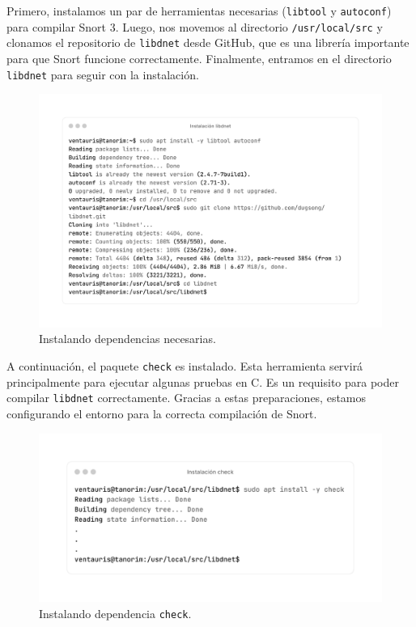 \documentclass[11pt,a4paper,twoside]{report}
\begin{document}
Primero, instalamos un par de herramientas necesarias (\texttt{libtool} y \texttt{autoconf}) para compilar Snort 3. Luego, nos movemos al directorio \texttt{/usr/local/src} y clonamos el repositorio de \texttt{libdnet} desde GitHub, que es una librería importante para que Snort funcione correctamente. Finalmente, entramos en el directorio \texttt{libdnet} para seguir con la instalación.

\begin{figure}[H]
	\centering
	\includegraphics[scale=0.12]{instalacion_snort/1-1.png}
	\caption{Instalando dependencias necesarias.}
\end{figure}

\newpage

A continuación, el paquete \texttt{check} es instalado. Esta herramienta servirá principalmente para ejecutar algunas pruebas en C. Es un requisito para poder compilar \texttt{libdnet} correctamente. Gracias a estas preparaciones, estamos configurando el entorno para la correcta compilación de Snort.

\begin{figure}[H]
	\centering
	\includegraphics[scale=0.12]{instalacion_snort/2-2.png}
	\caption{Instalando dependencia \texttt{check}.}
\end{figure}
\end{document}

